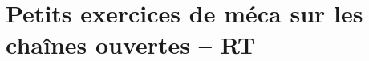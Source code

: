 \documentclass[10pt,fleqn]{article}
\newcommand{\repRel}{../..}
\newcommand{\repStyle}{\repRel/Style}
\newcommand{\td}{fichier_td}
\newcommand{\repExos}{\repRel/ExercicesCompetences}
\newcommand{\repExo}{dossier}
\begin{document}
\def\xxcompetences{}
\def\xxfigures{}
\graphicspath{{\repStyle/png/}}
\setlength{\columnseprule}{.1pt}

\def\xxpartie{}
\def\xxnumpartie{}
\def\xxchapitre{}
\def\xxnumchapitre{}
\def\xxactivite{DDV}
\def\xxtitreexo{Les ptits devoirs de vacances}
\def\xxsourceexo{Xavier Pessoles}

\pagestyle{fancy}
\thispagestyle{plain}
\vspace{4.5cm}
\proffalse


\section{Petits exercices de méca sur les chaînes ouvertes -- RT} 

\begin{multicols}{2} 
\renewcommand{\repExo}{\repExos/B2_ProposerModele/B2_12_ModeliserSchemasCinematiques/05_RT}
\renewcommand{\td}{05_RT}
\graphicspath{{\repStyle/png/}{\repExo/images/}}


\renewcommand{\repExo}{\repExos/B2_ProposerModele/B2_13_ModeliserCinematique/05_RT}
\renewcommand{\td}{05_RT}
\graphicspath{{\repStyle/png/}{\repExo/images/}}


\renewcommand{\repExo}{\repExos/B2_ProposerModele/B2_13_ModeliserCinematique/05_RT_02}
\renewcommand{\td}{05_RT_02}
\graphicspath{{\repStyle/png/}{\repExo/images/}}


\renewcommand{\repExo}{\repExos/C1_ProposerDemarche/C1_05_ProposerDemarcheActionMecaLoiMvt_PFS/05_RT}
\renewcommand{\td}{05_RT}
\graphicspath{{\repStyle/png/}{\repExo/images/}}


\renewcommand{\repExo}{\repExos/C2_MettreEnOeuvreDemarche/C2_07_PFS/05_RT}
\renewcommand{\td}{05_RT}
\graphicspath{{\repStyle/png/}{\repExo/images/}}


\end{multicols}


\proftrue


\newpage
\end{document}
